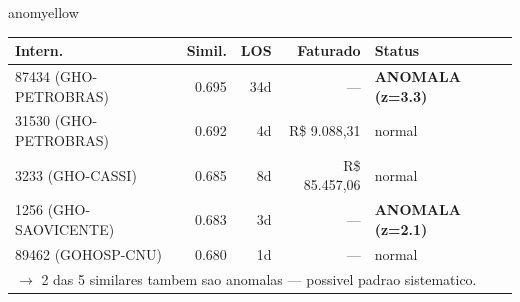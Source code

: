 \documentclass[a4paper,10pt]{article}
\begin{document}
\begin{anomalycard}[Internacao 165934 | GHO-PETROBRAS | MODERADO (z=2.69)]{anomyellow}
\begin{tabular}{l r r r l}\toprule\textbf{Intern.} & \textbf{Simil.} & \textbf{LOS} & \textbf{Faturado} & \textbf{Status} \\\midrule
87434 (GHO-PETROBRAS) & 0.695 & 34d & --- & \textcolor{anomred}{\textbf{ANOMALA (z=3.3)}} \\
31530 (GHO-PETROBRAS) & 0.692 & 4d & R\$ 9.088,31 & \textcolor{jcubeblue}{normal} \\
3233 (GHO-CASSI) & 0.685 & 8d & R\$ 85.457,06 & \textcolor{jcubeblue}{normal} \\
1256 (GHO-SAOVICENTE) & 0.683 & 3d & --- & \textcolor{anomred}{\textbf{ANOMALA (z=2.1)}} \\
89462 (GOHOSP-CNU) & 0.680 & 1d & --- & \textcolor{jcubeblue}{normal} \\
\multicolumn{5}{l}{\textcolor{anomred}{\small $\rightarrow$ 2 das 5 similares tambem sao anomalas --- possivel padrao sistematico.}} \\
\bottomrule\end{tabular}


\end{anomalycard}

\newpage
\end{document}
